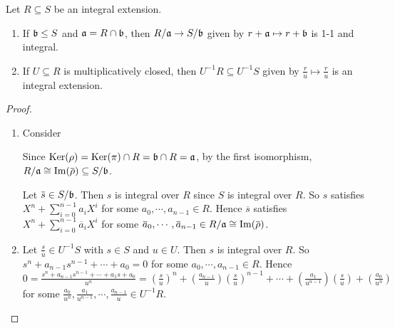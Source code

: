 \begin{proposition}
    Let $R \subseteq S$ be an integral extension.
    \begin{enumerate}
        \item If $\mathfrak{b} \leq S$ and $\mathfrak{a} = R \cap \mathfrak{b}$, then $R/\mathfrak{a} \to S/\mathfrak{b}$ given by $r+\mathfrak{a} \mapsto r+\mathfrak{b}$ is 1-1 and integral. 
        \item If $U \subseteq R$ is multiplicatively closed, then $U^{-1}R \subseteq U^{-1}S$ given by $\frac{r}{u} \mapsto \frac{r}{u}$ is an integral extension.
    \end{enumerate}
\end{proposition}

\begin{proof}
    \begin{enumerate}
        \item Consider
            \begin{center}
            \end{center}
            Since $\operatorname{Ker}(\rho) = \operatorname{Ker}(\pi) \cap R = \mathfrak{b} \cap R = \mathfrak{a}$, by the first isomorphism, $R/\ffa \cong \im(\overbar{\rho}) \subseteq S/\ffb$. \par 
            Let $\overbar{s} \in S/\ffb$. Then $s$ is integral over $R$ since $S$ is integral over $R$. So $s$ satisfies $X^{n} + \sum_{i=0}^{n-1}a_iX^{i}$ for some $a_0,\cdots,a_{n-1} \in R$. Hence $\overbar{s}$ satisfies $X^{n} + \sum_{i=0}^{n-1} \overbar{a}_iX^{i}$ for some $\overbar{a}_0,\cdots,\overbar{a}_{n-1} \in R/\ffa \cong \im(\overbar{\rho})$.
        \item Let $\frac{s}{u} \in U^{-1}S$ with $s \in S$ and $u \in U$. Then $s$ is integral over $R$. So $s^{n} + a_{n-1}s^{n-1} + \cdots + a_0 = 0$ for some $a_0,\cdots,a_{n-1} \in R$. Hence $0 = \frac{s^{n}+a_{n-1}s^{n-1} + \cdots + a_1s + a_0}{u^{n}} = (\frac{s}{u})^{n} + (\frac{a_{n-1}}{u})(\frac{s}{u})^{n-1} + \cdots + (\frac{a_1}{u^{n-1}})(\frac{s}{u}) + (\frac{a_0}{u^{n}})$ for some $\frac{a_0}{u^{n}},\frac{a_1}{u^{n-1}},\cdots,\frac{a_{n-1}}{u} \in U^{-1}R$. \qedhere
    \end{enumerate}
\end{proof}

